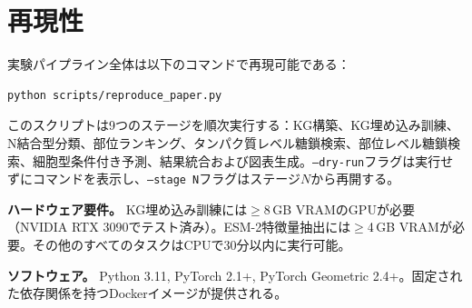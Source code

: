 \documentclass[11pt,a4paper]{ltjsarticle}
\begin{document}
\section{再現性}
\label{sec:reproducibility}

実験パイプライン全体は以下のコマンドで再現可能である：
\begin{verbatim}
python scripts/reproduce_paper.py
\end{verbatim}

このスクリプトは9つのステージを順次実行する：KG構築、KG埋め込み訓練、N結合型分類、部位ランキング、タンパク質レベル糖鎖検索、部位レベル糖鎖検索、細胞型条件付き予測、結果統合および図表生成。\texttt{--dry-run}フラグは実行せずにコマンドを表示し、\texttt{--stage N}フラグはステージ$N$から再開する。

\textbf{ハードウェア要件。}
KG埋め込み訓練には$\geq$8\,GB VRAMのGPUが必要（NVIDIA RTX 3090でテスト済み）。ESM-2特徴量抽出には$\geq$4\,GB VRAMが必要。その他のすべてのタスクはCPUで30分以内に実行可能。

\textbf{ソフトウェア。}
Python 3.11, PyTorch 2.1+, PyTorch Geometric 2.4+。固定された依存関係を持つDockerイメージが提供される。
\end{document}
